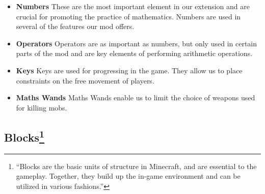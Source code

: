 \begin{itemize}

\item \textbf{Numbers}
\newline
\normalsize These are the most important element in our extension and are crucial for promoting the practice of mathematics. Numbers are used in several of the features our mod offers.

\item \textbf{Operators}
\newline
\normalsize Operators are as important as numbers, but only used in certain parts of the mod and are key elements of performing arithmetic operations.

\item \textbf{Keys}
\newline
\normalsize Keys are used for progressing in the game. They allow us to place constraints on the free movement of players.

\item \textbf{Maths Wands}
\newline
\normalsize Maths Wands enable us to limit the choice of weapons used for killing mobs.

\end{itemize}

\subsection[Blocks]{Blocks\footnote{``Blocks are the basic units of structure in Minecraft, and are essential to the gameplay. Together, they build up the in-game environment and can be utilized in various fashions.''\cite{website:minecraft-blocks}}}

